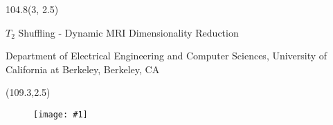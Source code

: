 \documentclass[t]{beamer}
\newcommand{\imgnobox}[2]{\begin{figure}[htp]\texttt{[image: \#1]}\end{figure}}
\begin{document}
\begin{textblock}{104.8}(3, 2.5)
\begin{block}{\center \Large $T_2$ Shuffling - Dynamic MRI Dimensionality Reduction}
\center {} \par \bigskip
Department of Electrical Engineering and Computer Sciences,  University of California at Berkeley, Berkeley, CA
\end{block}
\end{textblock}
\begin{textblock}{8.09}(109.3,2.5)
\begin{block}{\vspace*{-3ex}}
\imgnobox{seal.png}{0.87}
\end{block}
\end{textblock}
\end{document}
